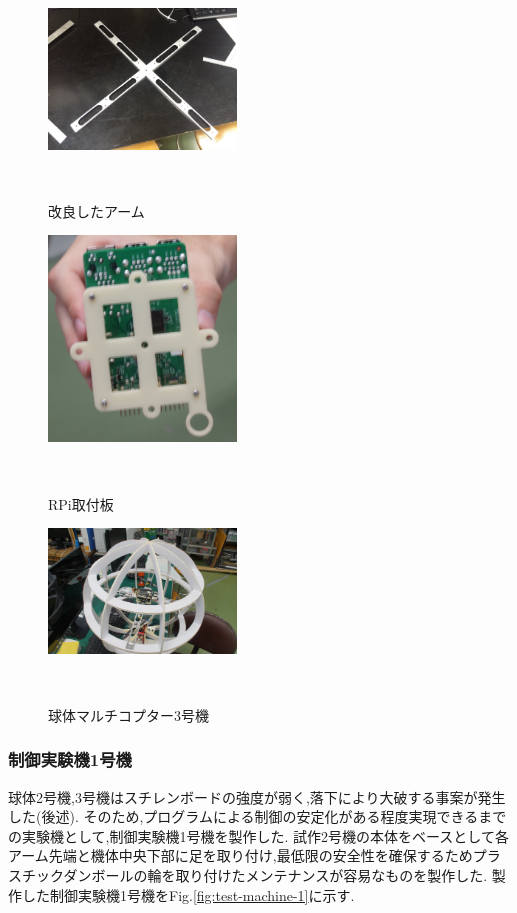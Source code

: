 \documentclass[a4paper]{jarticle}
\begin{document}
\begin{figure}[htbp]
 \begin{center}
  \includegraphics[width=50mm]{image/arm-2.JPG}
 　\caption{改良したアーム}
 　\label{fig:arm}
 \end{center}
\end{figure}

\begin{figure}[htbp]
 \begin{center}
  \includegraphics[width=50mm]{image/RPi-board-1.JPG}
 　\caption{RPi取付板}
 　\label{fig:RPi-board}
 \end{center}
\end{figure}

\begin{figure}[htbp]
 \begin{center}
  \includegraphics[width=50mm]{image/3.JPG}
 　\caption{球体マルチコプター3号機}
 　\label{fig:3}
 \end{center}
\end{figure}

\subsubsection{制御実験機1号機}
球体2号機,3号機はスチレンボードの強度が弱く,落下により大破する事案が発生した(後述).
そのため,プログラムによる制御の安定化がある程度実現できるまでの実験機として,制御実験機1号機を製作した.
試作2号機の本体をベースとして各アーム先端と機体中央下部に足を取り付け,最低限の安全性を確保するためプラスチックダンボールの輪を取り付けたメンテナンスが容易なものを製作した.
製作した制御実験機1号機をFig.\ref{fig:test-machine-1}に示す.
\end{document}
